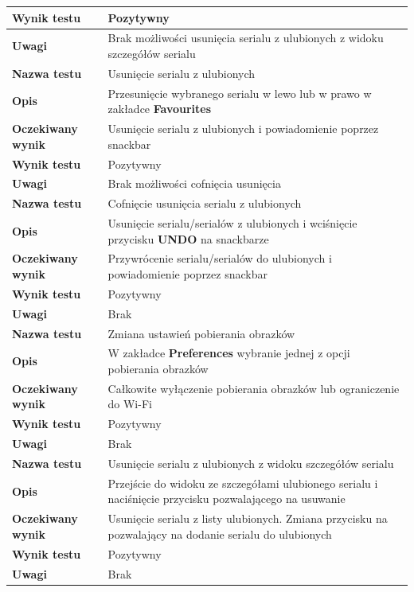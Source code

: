 \documentclass[10pt,a4paper]{article}
\begin{document}
\begin{tabularx}{\textwidth}{|l|X|}
	\hline
	\textbf{Wynik testu} & Pozytywny \\
	\hline
	\textbf{Uwagi} & Brak możliwości usunięcia serialu z ulubionych z widoku szczegółów serialu \\
	\hhline{==}
	\textbf{Nazwa testu} & Usunięcie serialu z ulubionych \\
	\hline
	\textbf{Opis} & Przesunięcie wybranego serialu w lewo lub w prawo w zakładce \textbf{Favourites} \\
	\hline
	\textbf{Oczekiwany wynik} & Usunięcie serialu z ulubionych i powiadomienie poprzez snackbar \\
	\hline
	\textbf{Wynik testu} & Pozytywny \\
	\hline
	\textbf{Uwagi} & Brak możliwości cofnięcia usunięcia \\
	\hhline{==}
	\textbf{Nazwa testu} & Cofnięcie usunięcia serialu z ulubionych \\
	\hline
	\textbf{Opis} & Usunięcie serialu/serialów z ulubionych i wciśnięcie przycisku \textbf{UNDO} na snackbarze \\
	\hline
	\textbf{Oczekiwany wynik} & Przywrócenie serialu/serialów do ulubionych i powiadomienie poprzez snackbar \\
	\hline
	\textbf{Wynik testu} & Pozytywny \\
	\hline
	\textbf{Uwagi} & Brak \\
	\hhline{==}
	\textbf{Nazwa testu} & Zmiana ustawień pobierania obrazków \\
	\hline
	\textbf{Opis} & W zakładce \textbf{Preferences} wybranie jednej z opcji pobierania obrazków \\
	\hline
	\textbf{Oczekiwany wynik} & Całkowite wyłączenie pobierania obrazków lub ograniczenie do Wi-Fi \\
	\hline
	\textbf{Wynik testu} & Pozytywny \\
	\hline
	\textbf{Uwagi} & Brak \\
	\hhline{==}
	\textbf{Nazwa testu} & Usunięcie serialu z ulubionych z widoku szczegółów serialu \\
	\hline
	\textbf{Opis} & Przejście do widoku ze szczegółami ulubionego serialu i naciśnięcie przycisku pozwalającego na usuwanie \\
	\hline
	\textbf{Oczekiwany wynik} & Usunięcie serialu z listy ulubionych. Zmiana przycisku na pozwalający na dodanie serialu do ulubionych \\
	\hline
	\textbf{Wynik testu} & Pozytywny \\
	\hline
	\textbf{Uwagi} & Brak \\

\end{tabularx}
\end{document}
